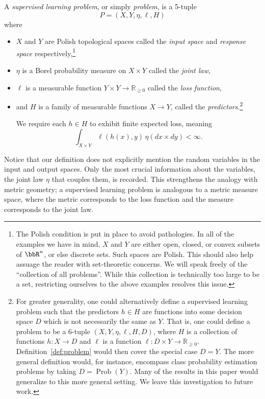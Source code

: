 \documentclass[twoside,11pt]{article}
\DeclareMathOperator{\prob}{Prob}
\begin{document}
\begin{definition}\label{def:problem}
    A \emph{supervised learning problem}, or simply \emph{problem}, is a 5-tuple
    \[P = (X,Y,\eta,\ell,H)\]
    where
    \begin{itemize}
        \item $X$ and $Y$ are Polish topological spaces called the \emph{input space} and \emph{response space} respectively,\footnote{The Polish condition is put in place to avoid pathologies. In all of the examples we have in mind, $X$ and $Y$ are either open, closed, or convex subsets of $\bbR^n$, or else discrete sets. Such spaces are Polish. This should also help assuage the reader with set-theoretic concerns. We will speak freely of the ``collection of all problems''. While this collection is technically too large to be a set, restricting ourselves to the above examples resolves this issue.}
        \item $\eta$ is a Borel probability measure on $X\times Y$ called the \emph{joint law},
        \item $\ell$ is a measurable function $Y\times Y \to \mathbb{R}_{\geq 0}$ called the \emph{loss function},
        \item and $H$ is a family of measurable functions $X\to Y$, called the \emph{predictors}.\footnote{For greater generality, one could alternatively define a supervised learning problem such that the predictors $h\in H$ are functions into some decision space $D$ which is not necessarily the same as $Y$. That is, one could define a problem to be a 6-tuple $(X,Y,\eta,\ell,H,D)$, where $H$ is a collection of functions $h:X\to D$ and $\ell$ is a function $\ell:D\times Y \to \mathbb R_{\geq 0}$. Definition~\ref{def:problem} would then cover the special case $D = Y$. The more general definition would, for instance, encompass class probability estimation problems by taking $D = \prob(Y)$. Many of the results in this paper would generalize to this more general setting. We leave this investigation to future work.}
       
        We require each $h\in H$ to exhibit finite expected loss, meaning
        \[\int_{X\times Y}\ell(h(x),y)\, \eta(dx{\times} dy) < \infty.\]
    \end{itemize}
\end{definition}
Notice that our definition does not explicitly mention the random variables in the input and output spaces. Only the most crucial information about the variables, the joint law $\eta$ that couples them, is recorded. This strengthens the analogy with metric geometry; a supervised learning problem is analogous to a metric measure space, where the metric corresponds to the loss function and the measure corresponds to the joint law.
\end{document}
